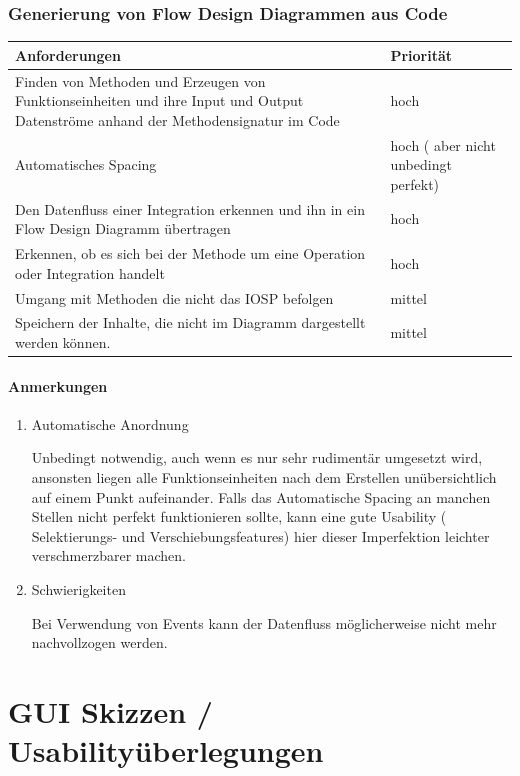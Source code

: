 \subsection{Generierung von Flow Design Diagrammen aus Code}

\begin{tabularx}{\textwidth}{X|l}
Anforderungen & Priorität\\
\hline
Finden von Methoden und Erzeugen von Funktionseinheiten und ihre Input und Output Datenströme anhand der Methodensignatur im Code & hoch\\ \hline
Automatisches Spacing & hoch ( aber nicht unbedingt perfekt)\\ \hline
Den Datenfluss einer Integration erkennen und ihn in ein Flow Design Diagramm übertragen & hoch\\ \hline
Erkennen, ob es sich bei der Methode um eine Operation oder Integration handelt & hoch\\ \hline
Umgang mit Methoden die nicht das IOSP befolgen & mittel\\ \hline
Speichern der Inhalte, die nicht im Diagramm dargestellt werden können. & mittel\\ \hline
\end{tabularx}

\subsubsection{Anmerkungen}

\begin{enumerate}
\item Automatische Anordnung

Unbedingt notwendig, auch wenn es nur sehr rudimentär umgesetzt wird, ansonsten liegen
alle Funktionseinheiten nach dem Erstellen unübersichtlich auf einem Punkt aufeinander.
Falls das Automatische Spacing an manchen Stellen nicht perfekt funktionieren
sollte, kann eine gute Usability ( Selektierungs- und Verschiebungsfeatures)
hier dieser Imperfektion leichter verschmerzbarer machen.

\item Schwierigkeiten

Bei Verwendung von Events kann der Datenfluss möglicherweise nicht mehr
nachvollzogen werden.
\end{enumerate}

\pagebreak
\chapter{GUI Skizzen / Usabilityüberlegungen}


